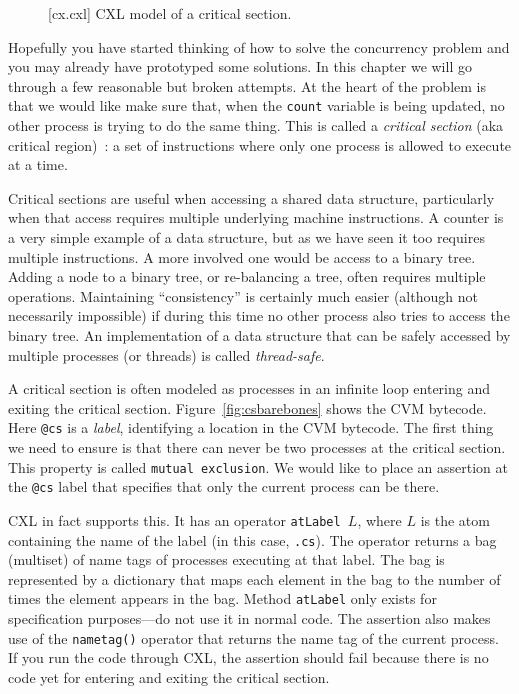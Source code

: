 \documentclass{report}
\newenvironment{code}{
\tcolorbox
}{
\endtcolorbox
}
\begin{document}
\begin{figure}
\begin{code}
\end{code}
\caption{[cx.cxl] CXL model of a critical section.}
\label{fig:cs}
\end{figure}

Hopefully you have started thinking of how to solve the concurrency
problem and you may already have prototyped some solutions.
In this chapter we will go through a few reasonable but broken attempts.
At the heart of the problem is that we would like make sure that, when
the \texttt{count} variable is being updated, no other process is
trying to do the same thing.  This is called a \emph{critical section}
(aka critical region)~\cite{EWD123}:
a set of instructions where only one process is allowed to execute at a
time.

Critical sections are useful when accessing a shared data
structure, particularly when that access requires multiple underlying
machine instructions.  A counter is a very simple example of
a data structure, but as we have seen it too requires multiple instructions.
A more involved one would be access to a binary tree.
Adding a node to a binary tree, or re-balancing a tree, often requires
multiple operations.  Maintaining ``consistency'' is certainly much easier
(although not necessarily impossible) if during this time no other
process also tries to access the binary tree.
An implementation of a data structure that can be safely accessed by multiple
processes (or threads) is called \emph{thread-safe}.

A critical section is often modeled as processes in an infinite loop
entering and exiting the critical section.
Figure~\ref{fig:csbarebones} shows the CVM bytecode.
Here \texttt{@cs} is a \emph{label},
identifying a location in the CVM bytecode.  The first thing we need to
ensure is that there can never be two processes at the critical section.
This property is called \texttt{mutual exclusion}.
We would like to place an assertion at the \texttt{@cs} label that
specifies that only the current process can be there.

CXL in fact supports this.
It has an operator \texttt{atLabel $L$},
where $L$
is the atom containing the name of the label (in this case, \texttt{.cs}).
The operator returns a bag (multiset) of name tags of processes executing at that
label.  The bag is represented by a dictionary that maps each element
in the bag to the number of times the element appears in the bag.
Method \texttt{atLabel} only exists for specification purposes---do not
use it in normal code.
The assertion also makes use of the \texttt{nametag()} operator
that returns the name tag of the current process.
If you run the code through CXL, the assertion should fail because
there is no code yet for entering and exiting the critical section.
\end{document}
